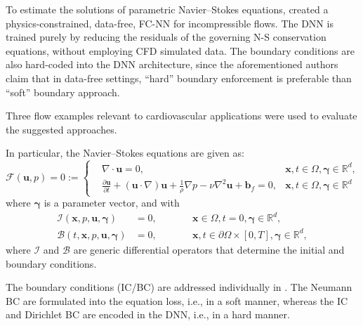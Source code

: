\documentclass[pdflatex,sn-basic]{sn-jnl}%
\theoremstyle{thmstyleone}%
\theoremstyle{thmstyletwo}%
\theoremstyle{thmstylethree}%
\begin{document}
To estimate the solutions of parametric Navier–Stokes equations, \cite{Sun2020_SurrogateModelingFluid_GaoSGPW} created a physics-constrained, data-free, FC-NN  for incompressible flows. The DNN is trained purely by reducing the residuals of the governing N-S conservation equations, without employing CFD simulated data. 
The boundary conditions are also hard-coded into the DNN architecture, since the aforementioned authors claim  that in data-free settings, ``hard'' boundary enforcement is preferable than ``soft'' boundary approach. %

Three flow examples relevant to cardiovascular applications were used to evaluate the suggested approaches. %

In particular, the Navier--Stokes equations are given \citep{Sun2020_SurrogateModelingFluid_GaoSGPW} as: 
\begin{equation*}
	\mathcal{F}(\mathbf{u}, p) = 0 := \left \{
	\begin{aligned}
	&\nabla \cdot \mathbf{u} = 0,  &\mathbf{x}, t \in \Omega, \boldsymbol{\gamma} \in \mathbb{R}^d,\\
	&\frac{\partial\mathbf{u}}{\partial t} + (\mathbf{u}\cdot\nabla)\mathbf{u} + \frac{1}{\rho}\nabla p - \nu\nabla^2\mathbf{u} + \mathbf{b}_f = 0, &\mathbf{x}, t \in  \Omega, \boldsymbol{\gamma} \in \mathbb{R}^d 
	\end{aligned} \right .
\end{equation*}
where $\boldsymbol{\gamma}$ is a parameter vector, and with
\begin{equation*}
	\begin{aligned}
	\mathcal{I}(\mathbf{x}, p, \mathbf{u}, \boldsymbol{\gamma}) &= 0, \qquad & &\mathbf{x} \in \Omega, t =0,\boldsymbol{\gamma} \in \mathbb{R}^d,\\
	\mathcal{B}(t, \mathbf{x}, p, \mathbf{u}, \boldsymbol{\gamma}) &= 0, \qquad & &\mathbf{x}, t \in \partial\Omega \times [0, T], \boldsymbol{\gamma} \in \mathbb{R}^d,
	\end{aligned}
\end{equation*}
where $\mathcal{I}$ and $\mathcal{B}$ are generic differential operators that determine the initial and boundary conditions.

The boundary conditions (IC/BC) are addressed individually in \cite{Sun2020_SurrogateModelingFluid_GaoSGPW}. The Neumann BC are formulated into the equation loss, i.e., in a soft manner, whereas the IC and Dirichlet BC are encoded in the DNN, i.e., in a hard manner.
\end{document}
